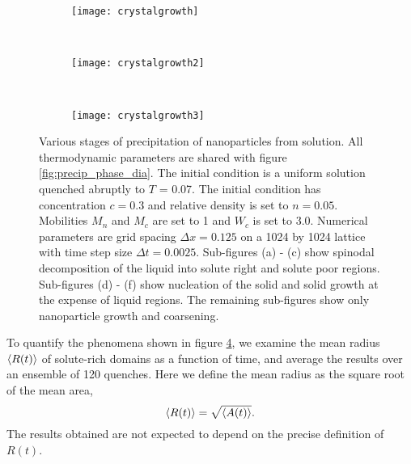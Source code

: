 \begin{figure}
    \vspace{0.25cm}
    \begin{subfigure}[b]{0.3\textwidth}
        \texttt{[image: crystalgrowth]}
        \label{fig:crystalgrowth}
        \caption{}
    \end{subfigure}
    ~
    \begin{subfigure}[b]{0.3\textwidth}
        \texttt{[image: crystalgrowth2]}
        \label{fig:crystalgrowth2}
        \caption{}
    \end{subfigure}
    ~ 
    \begin{subfigure}[b]{0.3\textwidth}
        \texttt{[image: crystalgrowth3]}
        \label{fig:crystalgrowth3}
        \caption{}
    \end{subfigure}
    \caption[Stages of precipitation of nanoparticles from solution]{
        \label{fig:precipitation}
        Various stages of precipitation of nanoparticles from solution. All
        thermodynamic parameters are shared with figure
        \ref{fig:precip_phase_dia}. The initial condition is a uniform solution
        quenched abruptly to $T$ = 0.07. The initial condition has
        concentration $c = 0.3$ and relative density is set to $n = 0.05$. Mobilities
        $M_n$ and $M_c$ are set to 1 and $W_c$ is set to 3.0. Numerical
        parameters are grid spacing $\Delta x = 0.125$ on a 1024 by 1024
        lattice with time step size $\Delta t = 0.0025$. Sub-figures (a) - (c)
        show spinodal decomposition of the liquid into solute right and solute
        poor regions. Sub-figures (d) - (f) show nucleation of the solid and
        solid growth at the expense of liquid regions.  The remaining
        sub-figures show only nanoparticle growth and coarsening.
    }
\end{figure}
%

%
To quantify the phenomena shown in figure \ref{fig:precipitation}, we examine
the mean radius $\left\langle R(t) \right\rangle$ of solute-rich domains as a function of time, and
average the results over an ensemble of 120 quenches. Here we define the mean
radius as the square root of the mean area,
%
\begin{equation}
    \left\langle R(t) \right\rangle = \sqrt{\left\langle A(t) \right\rangle}.
\end{equation}
%
The results obtained are not expected to depend on the precise definition of
$R(t)$.

